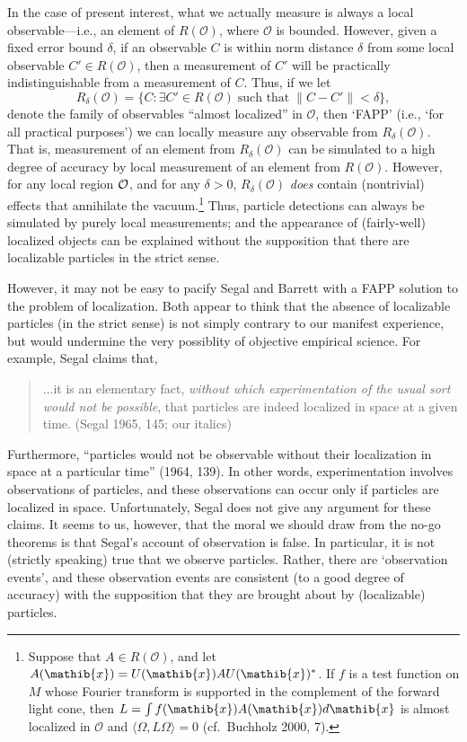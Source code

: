 \documentclass[11pt]{article}
\theoremstyle{remark}
\newcommand{\norm}[1]{\mbox{$\| #1\|$}}
\newcommand{\hil}[1]{\mathcal{#1}}
\begin{document}
In the case of present interest, what we actually measure is always a
local observable---i.e., an element of $R(\mathcal{O})$, where
$\mathcal{O}$ is bounded.  However, given a fixed error bound
$\delta$, if an observable $C$ is within norm distance $\delta$ from
some local observable $C'\in R(\mathcal{O})$, then a measurement of
$C'$ will be practically indistinguishable from a measurement of $C$.
Thus, if we let \begin{equation} R_{\delta}(\mathcal{O})= \{ C:
  \exists C' \in R(\mathcal{O})\; \mbox{such that}\;
  \norm{C-C'}<\delta \} ,\end{equation} denote the family of
observables ``almost localized'' in $\mathcal{O}$, then `FAPP' (i.e.,
`for all practical purposes') we can locally measure any observable
from $R_{\delta}(\mathcal{O})$.  That is, measurement of an element
from $R_{\delta}(\mathcal{O})$ can be simulated to a high degree of
accuracy by local measurement of an element from $R(\mathcal{O})$.
However, for any local region $\cal{O}$, and for any $\delta >0$,
$R_{\delta}(\mathcal{O})$ \emph{does} contain (nontrivial) effects
that annihilate the vacuum.\footnote{Suppose that $A\in R(\hil{O})$,
  and let $A(\mathib{x})=U(\mathib{x})AU(\mathib{x})^{*}$.  If $f$ is
  a test function on $M$ whose Fourier transform is supported in the
  complement of the forward light cone, then $L=\int
  f(\mathib{x})A(\mathib{x})d\mathib{x}$ is almost localized in
  $\hil{O}$ and $\langle \Omega ,L\Omega \rangle=0$ (cf.~Buchholz
  2000, 7).}  Thus, particle detections can always be simulated by
purely local measurements; and the appearance of (fairly-well)
localized objects can be explained without the supposition that there
are localizable particles in the strict sense.

However, it may not be easy to pacify Segal and Barrett with a FAPP
solution to the problem of localization.  Both appear to think that
the absence of localizable particles (in the strict sense) is not
simply contrary to our manifest experience, but would undermine the
very possiblity of objective empirical science.  For example, Segal
claims that,
\begin{quote} ...it
  is an elementary fact, \emph{without which experimentation of the
    usual sort would not be possible}, that particles are indeed
  localized in space at a given time. (Segal 1965, 145; our italics)
\end{quote} Furthermore, ``particles would not be observable without their localization in
space at a particular time'' (1964, 139).  In other words,
experimentation involves observations of particles, and these
observations can occur only if particles are localized in space.
Unfortunately, Segal does not give any argument for these claims.  It
seems to us, however, that the moral we should draw from the no-go
theorems is that Segal's account of observation is false.  In
particular, it is not (strictly speaking) true that we observe
particles.  Rather, there are `observation events', and these
observation events are consistent (to a good degree of accuracy) with
the supposition that they are brought about by (localizable)
particles.
\end{document}
